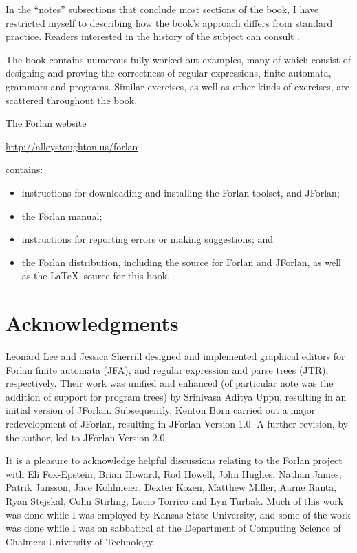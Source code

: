 In the ``notes'' subsections that conclude most sections of the book,
I have restricted myself to describing how the book's approach differs
from standard practice.  Readers interested in the history of the
subject can consult
\cite{HopcroftMotwaniUllman01,Kozen97,LewisPapadimitriou98}.

The book contains numerous fully worked-out examples, many of which
consist of designing and proving the correctness of regular
expressions, finite automata, grammars and programs.  Similar
exercises, as well as other kinds of exercises, are scattered
throughout the book.

The Forlan website
\begin{center}
\url{http://alleystoughton.us/forlan}
\end{center}
contains:
\begin{itemize}
\item instructions for downloading and installing the Forlan toolset,
  and JForlan;

\item the Forlan manual;

\item instructions for reporting errors or making suggestions; and

\item the Forlan distribution, including the source for Forlan and
  JForlan, as well as the \LaTeX\ source for this book.
\end{itemize}

\section*{Acknowledgments}
\label{Acknowledgments}

Leonard Lee and Jessica Sherrill designed and implemented graphical
editors for Forlan finite automata (JFA), and regular expression and
parse trees (JTR), respectively.  Their work was unified and enhanced
(of particular note was the addition of support for program trees) by
Srinivasa Aditya Uppu, resulting in an initial version of JForlan.
%
Subsequently, Kenton Born carried out a major redevelopment of
JForlan, resulting in JForlan Version 1.0. A further revision, by the
author, led to JForlan Version 2.0.

It is a pleasure to acknowledge helpful discussions relating to the
Forlan project with Eli Fox-Epstein, Brian Howard, Rod Howell, John
Hughes, Nathan James, Patrik Jansson, Jace Kohlmeier, Dexter Kozen,
Matthew Miller, Aarne Ranta, Ryan Stejskal, Colin Stirling, Lucio
Torrico and Lyn Turbak.  Much of this work was done while I was
employed by Kansas State University, and some of the work was done
while I was on sabbatical at the Department of Computing Science of
Chalmers University of Technology.


